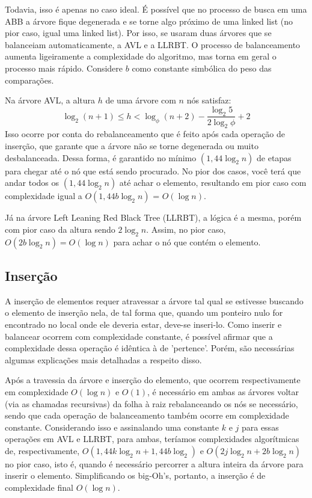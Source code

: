 \documentclass{article}
\begin{document}
Todavia, isso é apenas no caso ideal. É possível que no processo de busca em uma ABB a árvore fique degenerada
e se torne algo próximo de uma linked list (no pior caso, igual uma linked list). Por isso, se usaram duas árvores 
que se balanceiam automaticamente, a AVL e a LLRBT. O processo de balanceamento aumenta ligeiramente a complexidade
do algoritmo, mas torna em geral o processo mais rápido. Considere $b$ como constante simbólica do peso das comparações.

Na árvore AVL, a altura $h$ de uma árvore com $n$ nós satisfaz:
$$\log_2(n+1) \leq h < \log_\phi(n+2) - \frac{\log_2 5}{2\log_2\phi} + 2$$
Isso ocorre por conta do rebalanceamento que é feito após cada operação de inserção, que garante que a árvore 
não se torne degenerada ou muito desbalanceada. Dessa forma, é garantido no mínimo $(1,44\log_2 n)$ de etapas para chegar até o nó
que está sendo procurado. No pior dos casos, você terá que andar todos os $(1,44\log_2 n)$ até achar o elemento, resultando em
pior caso com complexidade igual a $O(1,44b \log_2 n )$ = $O(\log n)$.
    
Já na árvore Left Leaning Red Black Tree (LLRBT), a lógica é a mesma, porém com pior caso da altura sendo $2\log_2 n$. Assim,
no pior caso, $O(2b \log_2 n ) = O(\log n)$ para achar o nó que contém o elemento.

\subsection{Inserção}
A inserção de elementos requer atravessar a árvore tal qual se estivesse buscando o elemento de inserção nela, de tal forma que,
quando um ponteiro nulo for encontrado no local onde ele deveria estar, deve-se inseri-lo. Como inserir e balancear ocorrem com
complexidade constante, é possível afirmar que a complexidade dessa operação é idêntica à de 'pertence'. Porém, são necessárias 
algumas explicações mais detalhadas a respeito disso.

Após a travessia da árvore e inserção do elemento, que ocorrem respectivamente 
em complexidade $O(\log n)$ e $O(1)$, é necessário em ambas as árvores voltar (via as chamadas recursivas) da folha à raiz 
rebalanceando os nós se necessário, sendo que cada operação de balanceamento também ocorre em complexidade constante. Considerando 
isso e assinalando uma constante $k$ e $j$ para essas operações em AVL e LLRBT, para ambas, teríamos complexidades algorítmicas de, 
respectivamente, $O(1,44 k \log_2 n + 1,44 b \log_2 )$ e $O(2 j \log_2 n + 2 b \log_2 n)$ no pior caso, isto é, quando é necessário percorrer 
a altura inteira da árvore para inserir o elemento. Simplificando os big-Oh's, portanto, a inserção é de complexidade final 
$O(\log n)$.
\end{document}
